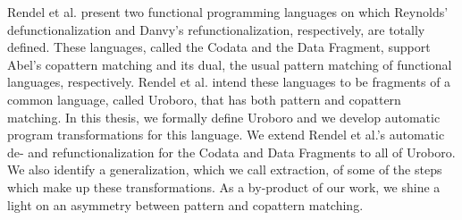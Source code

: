 % 
% 
%
Rendel et al. present two functional programming languages on which Reynolds' defunctionalization and Danvy's refunctionalization, respectively, are totally defined. These languages, called the Codata and the Data Fragment, support Abel's copattern matching and its dual, the usual pattern matching of functional languages, respectively. Rendel et al. intend these languages to be fragments of a common language, called Uroboro, that has both pattern and copattern matching. In this thesis, we formally define Uroboro and we develop automatic program transformations for this language. We extend Rendel et al.'s automatic de- and refunctionalization for the Codata and Data Fragments to all of Uroboro. We also identify a generalization, which we call extraction, of some of the steps which make up these transformations. As a by-product of our work, we shine a light on an asymmetry between pattern and copattern matching.
